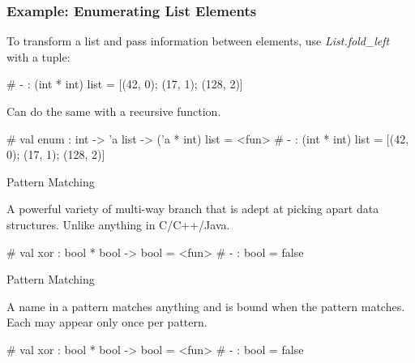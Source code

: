 \documentclass{plt}
\begin{document}
\begin{frame}[fragile]
  \frametitle{Example: Enumerating List Elements}

To transform a list and pass information between elements, use
\emph{List.fold\_left} with a tuple:

\begin{interactive}
# 
- : (int * int) list = [(42, 0); (17, 1); (128, 2)]
\end{interactive}
Can do the same
with a recursive function.

\begin{interactive}
# 
val enum : int -> 'a list -> ('a * int) list = <fun>
# 
- : (int * int) list = [(42, 0); (17, 1); (128, 2)]
\end{interactive}

\end{frame}

\begin{frame}[fragile]{Pattern Matching}

A powerful variety of multi-way branch that is adept at picking apart
data structures.  Unlike anything in C/C++/Java.

\begin{interactive}
# 
val xor : bool * bool -> bool = <fun>
# 
- : bool = false
\end{interactive}
\end{frame}

\begin{frame}[fragile]{Pattern Matching}

A name in a pattern matches anything and is bound when the pattern
matches.  Each may appear only once per pattern.

\begin{interactive}
# 
val xor : bool * bool -> bool = <fun>
# 
- : bool = false
\end{interactive}

\end{frame}
\end{document}
